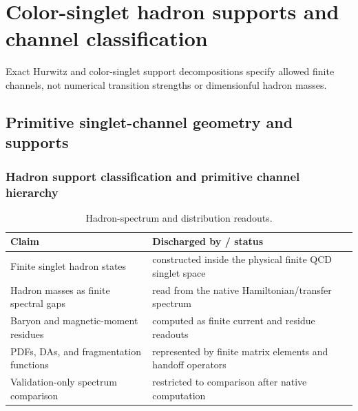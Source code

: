 \documentclass[12pt,a4paper]{article}
\begin{document}
\setlength{\emergencystretch}{2em}


\section{Color-singlet hadron supports and channel classification}
\label{p11:sec:v237-b2}
Exact Hurwitz and color-singlet support decompositions specify allowed finite channels, not numerical transition strengths or dimensionful hadron masses.

\label{p11:part:hadron-distribution-thermal-nuclear-readouts}


\subsection{Primitive singlet-channel geometry and supports}
\label{p11:sec:hadron-spectrum}


\subsubsection{Hadron support classification and primitive channel hierarchy}
\label{p11:subsec:hadron-support-primitive-channel-hierarchy}


\begin{table}[htbp]
\centering
\footnotesize
\begin{tabular}{>{\raggedright\arraybackslash}p{} >{\raggedright\arraybackslash}p{}}
\toprule
Claim & Discharged by / status \\
\midrule
Finite singlet hadron states & constructed inside the physical finite QCD singlet space \\
Hadron masses as finite spectral gaps & read from the native Hamiltonian/transfer spectrum \\
Baryon and magnetic-moment residues & computed as finite current and residue readouts \\
PDFs, DAs, and fragmentation functions & represented by finite matrix elements and handoff operators \\
Validation-only spectrum comparison & restricted to comparison after native computation \\
\bottomrule
\end{tabular}
\caption[Hadron-spectrum and distribution readouts]{Hadron-spectrum and distribution readouts.}
\label{p11:tab:hadron-spectrum-ledger}
\end{table}
\end{document}
